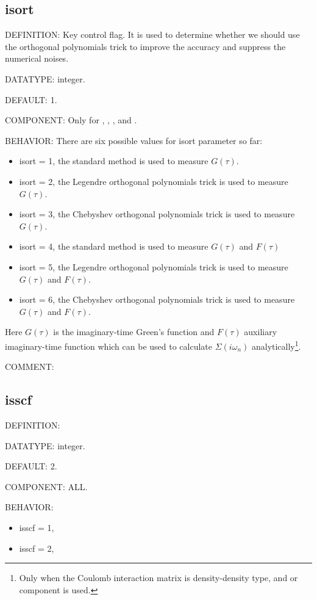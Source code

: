 \subsection{isort\label{subsec:isort}}
{\color{red}DEFINITION:} Key control flag. It is used to determine whether we should use the orthogonal polynomials trick to improve the accuracy and suppress the numerical noises.

{\color{green}DATATYPE:} integer.

{\color{blue}DEFAULT:} 1.

{\color{brown}COMPONENT:} Only for {\gardenia}, {\narcissus}, {\lavender}, and {\manjushaka}.

{\color{purple}BEHAVIOR:} There are six possible values for isort parameter so far:
\begin{itemize}
\item isort = 1, the standard method is used to measure $G(\tau)$.
\item isort = 2, the Legendre orthogonal polynomials trick is used to measure $G(\tau)$.
\item isort = 3, the Chebyshev orthogonal polynomials trick is used to measure $G(\tau)$.
\item isort = 4, the standard method is used to measure $G(\tau)$ and $F(\tau)$
\item isort = 5, the Legendre orthogonal polynomials trick is used to measure $G(\tau)$ and $F(\tau)$.
\item isort = 6, the Chebyshev orthogonal polynomials trick is used to measure $G(\tau)$ and $F(\tau)$.
\end{itemize}
Here $G(\tau)$ is the imaginary-time Green's function and $F(\tau)$ auxiliary imaginary-time function which can be used to calculate $\Sigma(i\omega_n)$ analytically\footnote{Only when the Coulomb interaction matrix is density-density type, and {\gardenia} or {\narcissus} component is used.}.

{\color{olive}COMMENT:}

\subsection{isscf\label{subsec:isscf}}
{\color{red}DEFINITION:}

{\color{green}DATATYPE:} integer.

{\color{blue}DEFAULT:} 2.

{\color{brown}COMPONENT:} ALL.

{\color{purple}BEHAVIOR:}
\begin{itemize}
\item isscf = 1,
\item isscf = 2,
\end{itemize}

